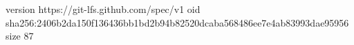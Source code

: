 version https://git-lfs.github.com/spec/v1
oid sha256:2406b2da150f136436bb1bd2b94b82520dcaba568486ee7e4ab83993dae95956
size 87
